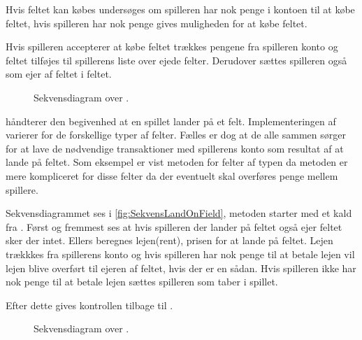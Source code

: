 Hvis feltet kan købes undersøges om spilleren har nok penge i kontoen til at købe feltet, hvis spilleren har nok penge gives muligheden for at købe  feltet.

Hvis spilleren accepterer at købe feltet trækkes pengene fra spilleren konto og feltet tilføjes til spillerens liste over ejede felter. Derudover sættes spilleren også som ejer af feltet i feltet.

\begin{figure}
\caption{Sekvensdiagram over .}
\label{fig:SekvensOptToBuy}
\centering

\end{figure}

 håndterer den begivenhed at en spillet lander på et felt. Implementeringen af  varierer for de forskellige typer af felter. Fælles er dog at de alle sammen sørger for at lave de nødvendige transaktioner med spillerens konto som resultat af at lande på feltet. Som eksempel er vist metoden for felter af typen  da metoden er mere kompliceret for disse felter da der eventuelt skal overføres penge mellem spillere.

Sekvensdiagrammet ses i \vref{fig:SekvensLandOnField}, metoden starter med et kald fra . Først og fremmest ses at hvis spilleren der lander på feltet også ejer feltet sker der intet. Ellers beregnes lejen(rent), prisen for at lande på feltet. Lejen trækkkes fra spillerens konto og hvis spilleren har nok penge til at betale lejen vil lejen blive overført til ejeren af feltet, hvis der er en sådan. Hvis spilleren ikke har nok penge til at betale lejen sættes spilleren som taber i spillet.

Efter dette gives kontrollen tilbage til .


\begin{figure}
\caption{Sekvensdiagram over .}
\label{fig:SekvensLandOnField}
\centering

\end{figure}